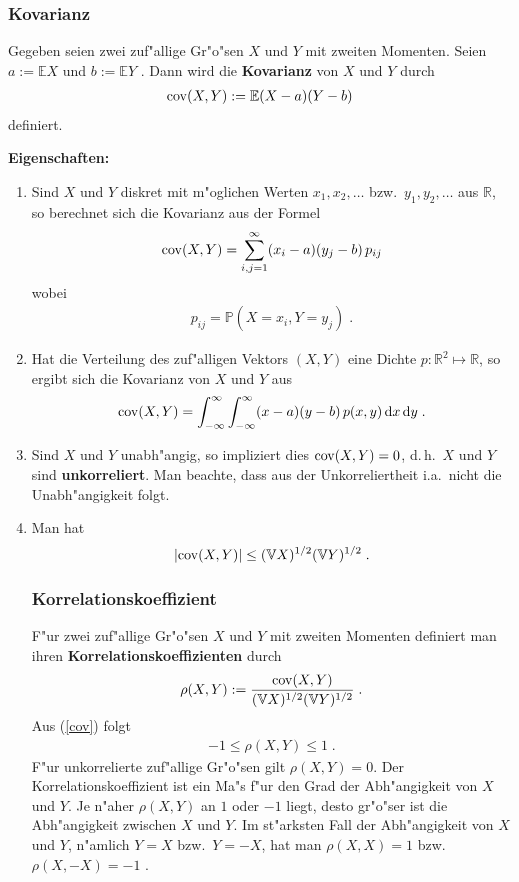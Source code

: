 \documentclass[ngerman,draft,parskip=half,twoside]{scrartcl}
\newcommand*{\R}{\mathbb{R}}      %
\newcommand*{\E}{\mathbb{E}}        %
\newcommand*{\V}{\mathbb{V}}        %
\newcommand*{\WKM}{\mathbb{P}}      %
\begin{document}
\subsubsection{Kovarianz}
Gegeben seien zwei zuf"allige Gr"o"sen $X$ und $Y$ mit zweiten Momenten.
Seien $a:=\E X$ und $b:=\E Y$ . Dann wird die \textbf{Kovarianz} von $X$ und $Y$ durch
\begin{gather*}
  {\rm  cov}(X,Y):= \E(X-a)(Y-b)
\end{gather*}
definiert.

\textbf{Eigenschaften:}

\begin{enumerate}
\item
Sind $X$ und $Y$ diskret mit m"oglichen Werten $x_1,x_2,\ldots$ bzw.~$y_1,y_2,\ldots$ aus $\R$,
so berechnet sich die Kovarianz aus der Formel
  \begin{gather*}
    {\rm  cov}(X,Y)=\sum_{i,j=1}^\infty (x_i-a)(y_j-b)\, p_{ij}
  \end{gather*}
wobei
  \begin{gather*}
    p_{ij}=\WKM(X=x_i, Y=y_j)\;.
  \end{gather*}
\item
Hat die Verteilung des zuf"alligen Vektors $(X,Y)$ eine Dichte $p \colon\R^2\mapsto\R$, so
ergibt sich die Kovarianz von $X$ und $Y$ aus
  \begin{gather*}
    {\rm  cov}(X,Y)=\int_{-\infty}^\infty \int_{-\infty}^\infty (x-a)(y-b)\,p(x,y)\,\mathrm d x\, \mathrm d y\;.
  \end{gather*}
\item
Sind $X$ und $Y$ unabh"angig, so impliziert dies ${\rm  cov}(X,Y)=0$, d.\,h.~$X$ und $Y$ sind
\textbf{unkorreliert}. Man beachte, dass aus der Unkorreliertheit i.a.~nicht die Unabh"angigkeit folgt.
\item
Man hat
\begin{equation}
\label{cov}
|{\rm  cov}(X,Y)|\le (\V X)^{1/2}(\V Y)^{1/2}\;.
\end{equation}
\subsubsection{Korrelationskoeffizient}
F"ur zwei zuf"allige Gr"o"sen $X$ und $Y$ mit zweiten Momenten definiert man ihren
\textbf{Korrelationskoeffizienten} durch
  \begin{gather*}
    \rho(X,Y):=\frac{{\rm  cov}(X,Y)}{(\V X)^{1/2}(\V Y)^{1/2}}\;.
  \end{gather*}
Aus (\ref{cov}) folgt
  \begin{gather*}
    -1\le \rho(X,Y)\le 1\;.
  \end{gather*}
F"ur unkorrelierte zuf"allige Gr"o"sen gilt $\rho(X,Y)=0$.
 Der Korrelationskoeffizient ist ein Ma"s f"ur den Grad der Abh"angigkeit von
$X$ und $Y$. Je n"aher $\rho(X,Y)$ an $1$ oder $-1$ liegt, desto gr"o"ser ist die
Abh"angigkeit zwischen $X$ und $Y$. Im st"arksten Fall
der Abh"angigkeit von $X$ und $Y$, n"amlich $Y=X$ bzw.~$Y=-X$, hat man $\rho(X,X)=1$ bzw.~$\rho(X,-X)=-1$ .
\end{enumerate}
\end{document}
